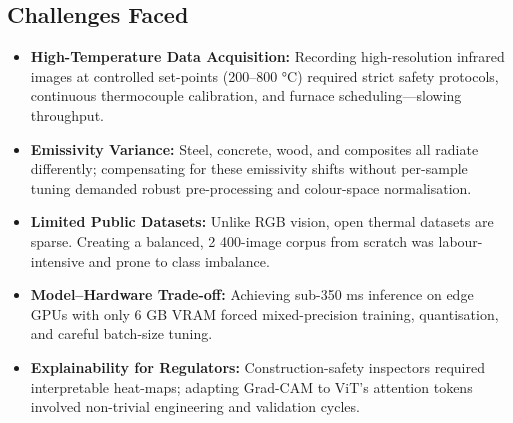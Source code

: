 
\subsection{Challenges Faced}

\begin{itemize}
    \item \textbf{High-Temperature Data Acquisition:}  
    Recording high-resolution infrared images at controlled set-points (200–800 °C) required strict safety protocols, continuous thermocouple calibration, and furnace scheduling—slowing throughput.

    \item \textbf{Emissivity Variance:}  
    Steel, concrete, wood, and composites all radiate differently; compensating for these emissivity shifts without per-sample tuning demanded robust pre-processing and colour-space normalisation.

    \item \textbf{Limited Public Datasets:}  
    Unlike RGB vision, open thermal datasets are sparse. Creating a balanced, 2 400-image corpus from scratch was labour-intensive and prone to class imbalance.

    \item \textbf{Model–Hardware Trade-off:}  
    Achieving sub-350 ms inference on edge GPUs with only 6 GB VRAM forced mixed-precision training, quantisation, and careful batch-size tuning.

    \item \textbf{Explainability for Regulators:}  
    Construction-safety inspectors required interpretable heat-maps; adapting Grad-CAM to ViT’s attention tokens involved non-trivial engineering and validation cycles.
\end{itemize}

